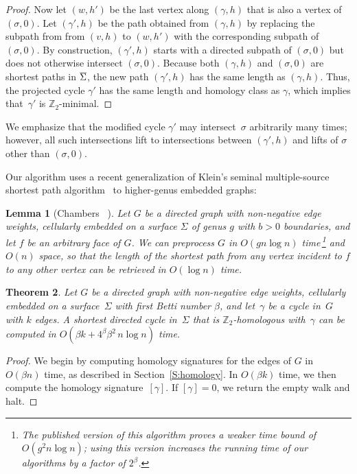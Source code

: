 \documentclass[twoside,leqno,twocolumn]{article}
\def\Z{\mathbb{Z}}
\let\cycle\gamma
\def\Sigmabar{\overline{\smash{\Sigma}\vphantom{t}}}
\newtheorem{theorem}{Theorem}[section]
\newtheorem{lemma}[theorem]{Lemma}
\begin{document}
{\begin{proof}
Now let $(w,h')$ be the last vertex along $(\cycle,h)$ that is also a vertex of $(\sigma,0)$.  Let $(\cycle', h)$ be the path obtained from $(\cycle, h)$ by replacing the subpath from from $(v,h)$ to $(w,h')$ with the corresponding subpath of $(\sigma,0)$.  By construction, $(\cycle', h)$ starts with a directed subpath of $(\sigma,0)$ but does not otherwise intersect $(\sigma,0)$.   Because both $(\cycle, h)$ and $(\sigma,0)$ are shortest paths in $\Sigmabar$, the new path $(\cycle', h)$ has the same length as $(\cycle, h)$.  Thus, the projected cycle $\cycle'$ has the same length and homology class as $\cycle$, which implies that~$\cycle'$ is $\Z_2$-minimal.
\end{proof}

We emphasize that the modified cycle $\cycle'$ may intersect~$\sigma$ arbitrarily many times; however, all such intersections lift to intersections between $(\cycle', h)$ and lifts of $\sigma$ other than $(\sigma, 0)$.

Our algorithm uses a recent generalization of Klein's seminal multiple-source shortest path algorithm~\cite{k-msspp-05} to higher-genus embedded graphs:

\begin{lemma}[Chambers \etal~\cite{cc-msspg-07,multishort}]
\label{L:multishort}
Let $G$ be a directed graph with non-negative edge weights, cellularly embedded on a surface $\Sigma$ of genus $g$ with $b>0$ boundaries, and let $f$ be an arbitrary face of $G$.  We can preprocess $G$ in $O(gn\log n)$ time\,\footnote{The published version of this algorithm \cite{cc-msspg-07} proves a weaker time bound of $O(g^2n\log n)$; using this version increases the running time of our algorithms by a factor of $2^\beta$.}\! and $O(n)$ space, so that the length of the shortest path from any vertex incident to $f$ to any other vertex can be retrieved in $O(\log n)$ time.
\end{lemma}

\begin{theorem}
\label{Th:min-cycle}
Let $G$ be a directed graph with non-negative edge weights, cellularly embedded on a surface~$\Sigma$ with first Betti number $\beta$, and let~$\cycle$ be a cycle in~$G$ with $k$ edges.  A shortest directed cycle in~$\Sigma$ that is $\Z_2$-homologous with~$\cycle$ can be computed in $O(\beta k + 4^\beta \beta^2\, n\log n)$ time.
\end{theorem}

\begin{proof}
We begin by computing homology signatures for the edges of $G$ in $O(\beta n)$ time, as described in Section~\ref{S:homology}.  In $O(\beta k)$ time, we then compute the homology signature~$[\cycle]$.  If $[\cycle] = 0$, we return the empty walk and halt.


\end{proof}}
\end{document}
